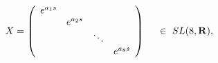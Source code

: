 \begin{equation}
X = \left(
\begin{array}{cccc}
e^{a_1s} & & & \\ & e^{a_2s} & & \\ & & \ddots & \\ & & & e^{a_8s}
   \label{SL(8)}
\end{array}
\right) \hspace{5mm} \in \ SL(8,{\bf R}), 
\end{equation}

